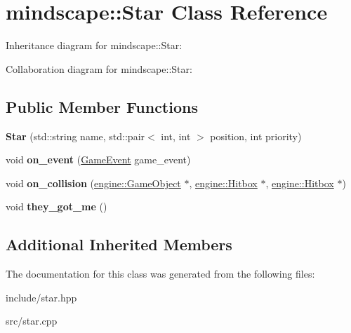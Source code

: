 \hypertarget{classmindscape_1_1_star}{}\section{mindscape\+:\+:Star Class Reference}
\label{classmindscape_1_1_star}


Inheritance diagram for mindscape\+:\+:Star\+:


Collaboration diagram for mindscape\+:\+:Star\+:
\subsection*{Public Member Functions}
\begin{DoxyCompactItemize}
\item 
{\bfseries Star} (std\+::string name, std\+::pair$<$ int, int $>$ position, int priority)\hypertarget{classmindscape_1_1_star_ab783f62c3988243dd7f50eab2499c181}{}\label{classmindscape_1_1_star_ab783f62c3988243dd7f50eab2499c181}

\item 
void {\bfseries on\+\_\+event} (\hyperlink{class_game_event}{Game\+Event} game\+\_\+event)\hypertarget{classmindscape_1_1_star_a6a9316e0d1ca0e8f2fb407d0c67b61ce}{}\label{classmindscape_1_1_star_a6a9316e0d1ca0e8f2fb407d0c67b61ce}

\item 
void {\bfseries on\+\_\+collision} (\hyperlink{classengine_1_1_game_object}{engine\+::\+Game\+Object} $\ast$, \hyperlink{classengine_1_1_hitbox}{engine\+::\+Hitbox} $\ast$, \hyperlink{classengine_1_1_hitbox}{engine\+::\+Hitbox} $\ast$)\hypertarget{classmindscape_1_1_star_ad52e47751352be18a89aea676d3753c5}{}\label{classmindscape_1_1_star_ad52e47751352be18a89aea676d3753c5}

\item 
void {\bfseries they\+\_\+got\+\_\+me} ()\hypertarget{classmindscape_1_1_star_a7d9082a463089da7be60a85a33b57538}{}\label{classmindscape_1_1_star_a7d9082a463089da7be60a85a33b57538}

\end{DoxyCompactItemize}
\subsection*{Additional Inherited Members}


The documentation for this class was generated from the following files\+:\begin{DoxyCompactItemize}
\item 
include/star.\+hpp\item 
src/star.\+cpp\end{DoxyCompactItemize}
